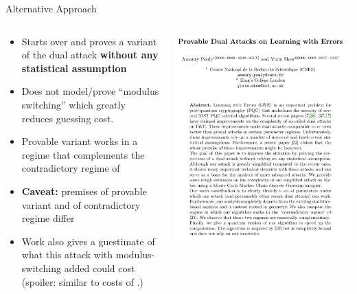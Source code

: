 \documentclass[xcolor=table,10pt,aspectratio=169]{beamer}
\begin{document}
\begin{frame}[label={sec:orgaf2ab97}]{Alternative Approach}
\begin{columns}
\begin{column}{0.55\columnwidth}
\begin{itemize}
\item Starts over and proves a variant of the dual attack \textbf{without any statistical assumption}
\item Does not model/prove ``modulus switching'' which greatly reduces guessing cost.
\item Provable variant works in a regime that complements the contradictory regime of \cite{EPRINT:DucPul23}
\item \textbf{Caveat:} premises of provable variant and of contradictory regime differ
\item Work also gives a guestimate of what this attack with modulus-switching added could cost (spoiler: similar to costs of \cite{Matzov22}.)
\end{itemize}
\end{column}

\begin{column}{0.45\columnwidth}
\begin{center}
\includegraphics[keepaspectratio,height=.8\textheight]{./yixin.png}
\end{center}
\end{column}
\end{columns}
\end{frame}
\end{document}
